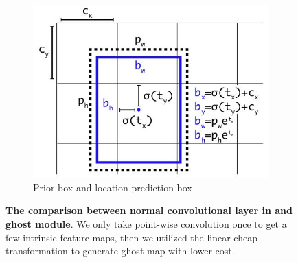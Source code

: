 \begin{figure}[h]
\begin{center}
\begin{subfigure}[b]{0.49\textwidth}
			\includegraphics[width=\textwidth]{thesis-template-master/images/anchor.JPG}
			\caption{ Prior box and location prediction box}
			\label{fig:res18}
		\end{subfigure}
	\end{center}
	\caption{\textbf{The comparison between normal convolutional layer in \cite{b26}\cite{b27}\cite{b28} and ghost module}. We only take point-wise convolution once to get a few intrinsic feature maps, then we utilized the linear cheap transformation to generate ghost map with lower cost.}
\end{figure}

